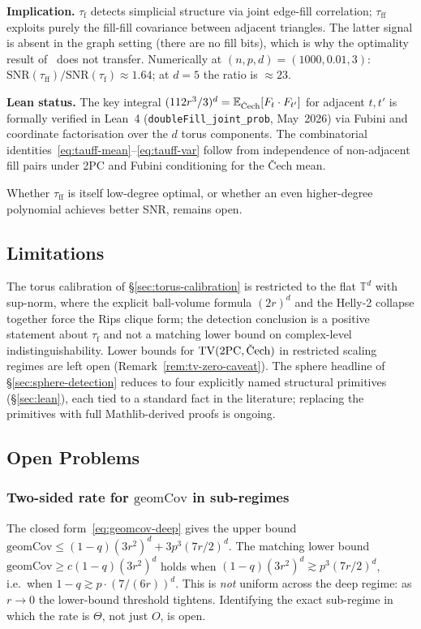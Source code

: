 \documentclass[reqno,12pt]{amsart}
\newcommand{\tauf}{\tau_{\mathrm{f}}}
\newcommand{\tauff}{\tau_{\mathrm{ff}}}
\newcommand{\PC}{\mathrm{2PC}}
\newcommand{\Cech}{\ifmmode\text{\v{C}ech}\else\v{C}ech\fi}  %
\newcommand{\TV}{\mathrm{TV}}
\newcommand{\geomCov}{\mathrm{geomCov}}
\newcommand{\TT}{\mathbb{T}}         %
\newcommand{\EE}{\mathbb{E}}
\theoremstyle{plain}
\theoremstyle{definition}
\theoremstyle{remark}
\begin{document}
\textbf{Implication.} $\tauf$ detects simplicial structure via joint edge-fill correlation;
$\tauff$ exploits purely the fill-fill covariance between adjacent triangles. The latter signal
is absent in the graph setting (there are no fill bits), which is why the optimality result
of~\cite{BangachevBresler2024} does not transfer. Numerically at $(n,p,d) = (1000,0.01,3)$:
$\mathrm{SNR}(\tauff)/\mathrm{SNR}(\tauf) \approx 1.64$; at $d = 5$ the ratio is $\approx 23$.

\textbf{Lean status.} The key integral $(112r^3/3)^d = \EE_{\Cech}[F_t \cdot F_{t'}]$ for adjacent
$t,t'$ is formally verified in Lean~4 (\texttt{doubleFill\_joint\_prob}, May~2026) via Fubini
and coordinate factorisation over the $d$ torus components. The combinatorial
identities~\eqref{eq:tauff-mean}--\eqref{eq:tauff-var} follow from independence of non-adjacent
fill pairs under 2PC and Fubini conditioning for the \v{C}ech mean.

Whether $\tauff$ is itself low-degree optimal, or whether an even higher-degree polynomial achieves
better SNR, remains open.

\subsection{Limitations}

The torus calibration of \S\ref{sec:torus-calibration} is restricted to the flat
$\TT^d$ with sup-norm, where the explicit ball-volume formula $(2r)^d$ and the Helly-2
collapse together force the Rips clique form; the detection conclusion is a positive
statement about $\tauf$ and not a matching lower bound on complex-level
indistinguishability. Lower bounds for $\TV(\PC, \Cech)$ in restricted scaling regimes
are left open (Remark~\ref{rem:tv-zero-caveat}). The sphere headline of
\S\ref{sec:sphere-detection} reduces to four explicitly named structural primitives
(\S\ref{sec:lean}), each tied to a standard fact in the literature; replacing the
primitives with full Mathlib-derived proofs is ongoing.

\subsection{Open Problems}\label{sec:open}

\subsubsection*{Two-sided rate for $\geomCov$ in sub-regimes}
The closed form~\eqref{eq:geomcov-deep} gives the upper bound
$\geomCov \leq (1-q)(3r^2)^d + 3p^3(7r/2)^d$. The matching lower bound
$\geomCov \geq c(1-q)(3r^2)^d$ holds when $(1-q)(3r^2)^d \gtrsim p^3(7r/2)^d$,
i.e.\ when $1-q \gtrsim p\cdot(7/(6r))^d$. This is \emph{not} uniform across the
deep regime: as $r\to 0$ the lower-bound threshold tightens. Identifying the exact
sub-regime in which the rate is $\Theta$, not just $O$, is open.
\end{document}
